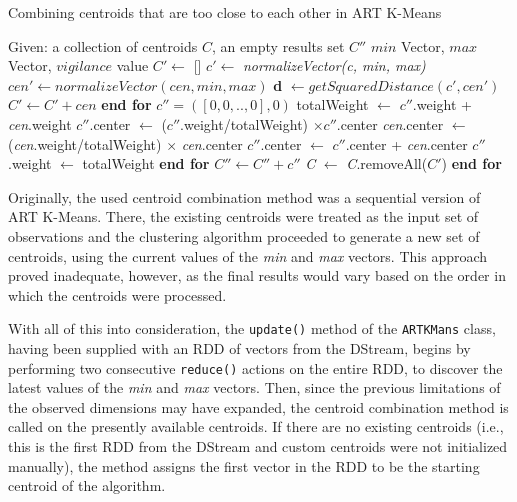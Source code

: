 \documentclass{l4proj}
\begin{document}
\begin{algorithm}[H]
\caption{Combining centroids that are too close to each other in ART K-Means}
\begin{algorithmic}[1]
\State Given: a collection of centroids $C$, an empty results set $C''$ 
\State \hspace{1.1cm} $min$ Vector, $max$ Vector, $vigilance$ value
    \State $C' \gets$ []
    \State $c' \gets$ \textit{normalizeVector(c, min, max)}
        \State $cen' \gets normalizeVector(cen, min, max)$
        \State \textbf{d} $\gets getSquaredDistance(c', cen')$
            \State $C' \gets C' + cen$
        \EndIf
    \EndFor
    \State \textbf{end for}
    \State $c'' = ([0 ,0, .., 0], 0)$
    	\State totalWeight $\gets$ $c''$.weight + \textit{cen}.weight
        \State $c''$.center $\gets$ ($c''$.weight/totalWeight) $\times c''$.center
        \State \textit{cen}.center $\gets$ (\textit{cen}.weight/totalWeight) $\times$ \textit{cen}.center
        \State $c''$.center $\gets$ $c''$.center + \textit{cen}.center
        \State $c''$.weight $\gets$ totalWeight
    \EndFor
    \State \textbf{end for}
    \State $C'' \gets C'' + c''$
    \State \textit{C} $\gets$ \textit{C}.removeAll($C'$)
\EndFor
\State \textbf{end for}
\end{algorithmic}
\end{algorithm}

Originally, the used centroid combination method was a sequential version of ART K-Means. There, the existing centroids were treated as the input set of observations and the clustering algorithm proceeded to generate a new set of centroids, using the current values of the \textit{min} and \textit{max} vectors. This approach proved inadequate, however, as the final results would vary based on the order in which the centroids were processed.

With all of this into consideration, the \texttt{update()} method of the \texttt{ARTKMans} class, having been supplied with an RDD of vectors from the DStream, begins by performing two consecutive \texttt{reduce()} actions on the entire RDD, to discover the latest values of the \textit{min} and \textit{max} vectors. Then, since the previous limitations of the observed dimensions may have expanded, the centroid combination method is called on the presently available centroids. If there are no existing centroids (i.e., this is the first RDD from the DStream and custom centroids were not initialized manually), the method assigns the first vector in the RDD to be the starting centroid of the algorithm.
\end{document}
